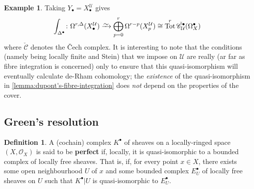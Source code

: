 \documentclass[11pt,fleqn]{article}
\theoremstyle{plain}
\theoremstyle{definition}
\newtheorem{definition}[theorem]{Definition}
\newtheorem{example}[theorem]{Example}
\theoremstyle{remark}
\numberwithin{equation}{theorem}
\newcommand{\cover}{\mathcal{U}}
\newcommand{\OO}{\mathcal{O}}
\newcommand{\restricted}{\mathbin{\big\vert}}
\newcommand{\congto}{\xrightarrow{\raisebox{-.5ex}[0ex][0ex]{$\sim$}}}
\newcommand{\cech}{\check{\mathscr{C}}}
\newcommand{\define}[1]{\textbf{#1}}
\newcommand{\nerve}[1]{X_{#1}^\cover}
\DeclareMathOperator{\Tot}{Tot}
\begin{document}
        \begin{example}\label{example:fibre-integration-gives-cech-de-rham}
            Taking $Y_\bullet=\nerve{\bullet}$ gives
            \[
                \int_{\Delta^\bullet}\colon \Omega^{r,\Delta}({\nerve{\bullet}})
                \congto
                \bigoplus_{p=0}^r\Omega^{r-p}({\nerve{p}})
                \cong
                \Tot^r\cech_\cover^\bullet(\Omega^\bullet_X)
            \]
            where $\cech$ denotes the Čech complex.
            It is interesting to note that the conditions (namely being locally finite and Stein) that we impose on $\cover$ are really (ar far as fibre integration is concerned) only to ensure that this quasi-isomorphism will eventually calculate de-Rham cohomology; the \emph{existence} of the quasi-isomorphism in \cref{lemma:dupont's-fibre-integration} does \emph{not} depend on the properties of the cover.
        \end{example}


    \subsection{Green's resolution}

        \begin{definition}
            A (cochain) complex $K^\bullet$ of sheaves on a locally-ringed space $(X,\OO_X)$ is said to be \define{perfect} if, locally, it is quasi-isomorphic to a bounded complex of locally free sheaves.
            That is, if, for every point $x\in X$, there exists some open neighbourhood $U$ of $x$ and some bounded complex $E^\bullet_U$ of locally free sheaves on $U$ such that $K^\bullet\restricted U$ is quasi-isomorphic to $E^\bullet_U$.
        \end{definition}
\end{document}
